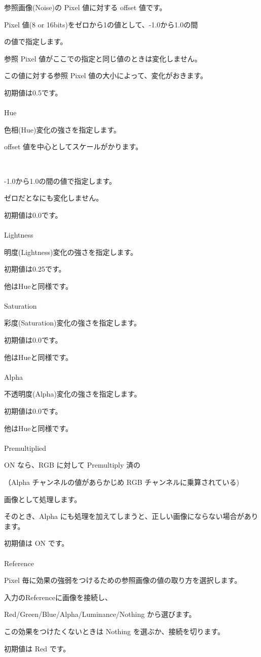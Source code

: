 \documentclass[a4paper,12pt]{article}
\begin{document}
参照画像(Noise)の Pixel 値に対する offset 値です。\par
Pixel 値(8 or 16bits)をゼロから1の値として、-1.0から1.0の間\par
の値で指定します。\par
参照 Pixel 値がここでの指定と同じ値のときは変化しません。\par
この値に対する参照 Pixel 値の大小によって、変化がおきます。\par
初期値は0.5です。\\
\\
Hue\par
色相(Hue)変化の強さを指定します。\par
offset 値を中心としてスケールがかります。

\newpage

\thispagestyle{empty}

\ \vspace{-0.2em}
\par
-1.0から1.0の間の値で指定します。\par
ゼロだとなにも変化しません。\par
初期値は0.0です。\\
\\
Lightness\par
明度(Lightness)変化の強さを指定します。\par
初期値は0.25です。\par
他は\textquotedbl Hue\textquotedbl と同様です。\\
\\
Saturation\par
彩度(Saturation)変化の強さを指定します。\par
初期値は0.0です。\par
他は\textquotedbl Hue\textquotedbl と同様です。\\
\\
Alpha\par
不透明度(Alpha)変化の強さを指定します。\par
初期値は0.0です。\par
他は\textquotedbl Hue\textquotedbl と同様です。\\
\\
Premultiplied\par
ON なら、RGB に対して Premultiply 済の\par
（Alpha チャンネルの値があらかじめ RGB チャンネルに乗算されている)\par
画像として処理します。\par
そのとき、Alpha にも処理を加えてしまうと、正しい画像にならない場合があります。\par
初期値は ON です。\\
\\
Reference\par
Pixel 毎に効果の強弱をつけるための参照画像の値の取り方を選択します。\par
入力の\textquotedbl Reference\textquotedbl に画像を接続し、\par
Red/Green/Blue/Alpha/Luminance/Nothing から選びます。\par
この効果をつけたくないときは Nothing を選ぶか、接続を切ります。\par
初期値は Red です。
\end{document}
